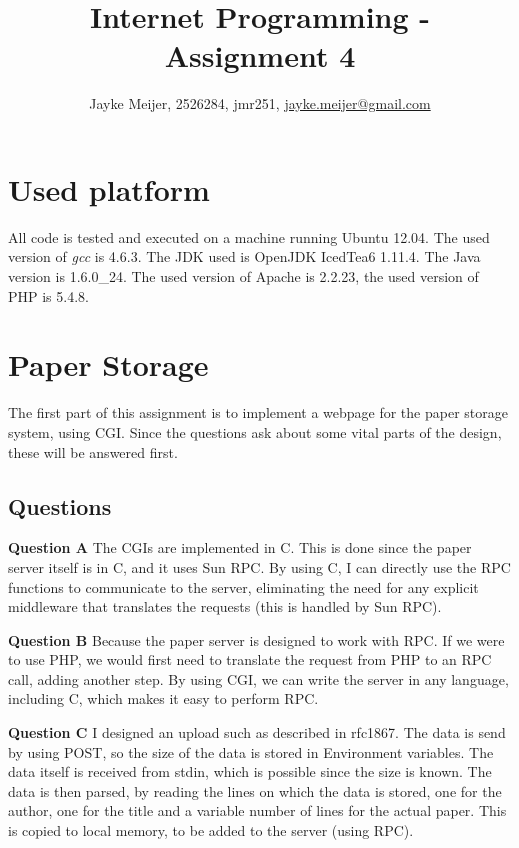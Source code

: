 \documentclass[a4paper]{article}
\title{Internet Programming - Assignment 4}
\author{Jayke Meijer, 2526284, jmr251, \url{jayke.meijer@gmail.com}}
\begin{document}
\maketitle

\tableofcontents
\pagebreak

\section{Used platform}

All code is tested and executed on a machine running Ubuntu 12.04. The used version of
\emph{gcc} is 4.6.3. The JDK used is OpenJDK IcedTea6 1.11.4. The Java version is
1.6.0\_24. The used version of Apache is 2.2.23, the used version of PHP is 5.4.8.

\section{Paper Storage}

The first part of this assignment is to implement a webpage for the paper storage system, using
CGI. Since the questions ask about some vital parts of the design, these will be answered 
first.

\subsection{Questions}

\textbf{Question A} The CGIs are implemented in C. This is done since the paper server itself is in C,
and it uses Sun RPC. By using C, I can directly use the RPC functions to communicate to the server,
eliminating the need for any explicit middleware that translates the requests (this is handled by Sun RPC).

\textbf{Question B} Because the paper server is designed to work with RPC. If we were to use PHP, we would
first need to translate the request from PHP to an RPC call, adding another step. By using CGI, we can
write the server in any language, including C, which makes it easy to perform RPC.

\textbf{Question C} I designed an upload such as described in rfc1867. The data is send by using POST,
so the size of the data is stored in Environment variables. The data itself is received from stdin, which
is possible since the size is known. The data is then parsed, by reading the lines on which the data is
stored, one for the author, one for the title and a variable number of lines for the actual paper. This is
copied to local memory, to be added to the server (using RPC).
\end{document}

